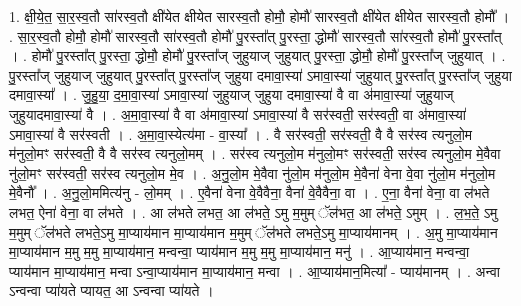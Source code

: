 \documentclass[17pt]{extarticle}
\begin{document}
1. क्षी॒ये॒त॒ सा॒र॒स्व॒तौ सा॑रस्व॒तौ क्षी॑येत क्षीयेत सारस्व॒तौ होमौ॒ होमौ॑ सारस्व॒तौ क्षी॑येत क्षीयेत सारस्व॒तौ होमौ᳚ । . सा॒र॒स्व॒तौ होमौ॒ होमौ॑ सारस्व॒तौ सा॑रस्व॒तौ होमौ॑ पु॒रस्ता᳚त् पु॒रस्ता॒ द्धोमौ॑ सारस्व॒तौ सा॑रस्व॒तौ होमौ॑ पु॒रस्ता᳚त् । . होमौ॑ पु॒रस्ता᳚त् पु॒रस्ता॒ द्धोमौ॒ होमौ॑ पु॒रस्ता᳚ज् जुहुयाज् जुहुयात् पु॒रस्ता॒ द्धोमौ॒ होमौ॑ पु॒रस्ता᳚ज् जुहुयात् । . पु॒रस्ता᳚ज् जुहुयाज् जुहुयात् पु॒रस्ता᳚त् पु॒रस्ता᳚ज् जुहुया दमावा॒स्या॑ ऽमावा॒स्या॑ जुहुयात् पु॒रस्ता᳚त् पु॒रस्ता᳚ज् जुहुया दमावा॒स्या᳚ । . जु॒हु॒या॒ द॒मा॒वा॒स्या॑ ऽमावा॒स्या॑ जुहुयाज् जुहुया दमावा॒स्या॑ वै वा अ॑मावा॒स्या॑ जुहुयाज् जुहुयादमावा॒स्या॑ वै । . अ॒मा॒वा॒स्या॑ वै वा अ॑मावा॒स्या॑ ऽमावा॒स्या॑ वै सर॑स्वती॒ सर॑स्वती॒ वा अ॑मावा॒स्या॑ ऽमावा॒स्या॑ वै सर॑स्वती । . अ॒मा॒वा॒स्येत्य॑मा - वा॒स्या᳚ । . वै सर॑स्वती॒ सर॑स्वती॒ वै वै सर॑स्व त्यनुलो॒म म॑नुलो॒मꣳ सर॑स्वती॒ वै वै सर॑स्व त्यनुलो॒मम् । . सर॑स्व त्यनुलो॒म म॑नुलो॒मꣳ सर॑स्वती॒ सर॑स्व त्यनुलो॒म मे॒वैवा नु॑लो॒मꣳ सर॑स्वती॒ सर॑स्व त्यनुलो॒म मे॒व । . अ॒नु॒लो॒म मे॒वैवा नु॑लो॒म म॑नुलो॒म मे॒वैना॑ वेना वे॒वा नु॑लो॒म म॑नुलो॒म मे॒वैनौ᳚ । . अ॒नु॒लो॒ममित्य॑नु - लो॒मम् । . ए॒वैना॑ वेना वे॒वैवैना॒ वैना॑ वे॒वैवैना॒ वा । . ए॒ना॒ वैना॑ वेना॒ वा ल॑भते लभत॒ ऐना॑ वेना॒ वा ल॑भते । . आ ल॑भते लभत॒ आ ल॑भते॒ ऽमु म॒मुम् ॅल॑भत॒ आ ल॑भते॒ ऽमुम् । . ल॒भ॒ते॒ ऽमु म॒मुम् ॅल॑भते लभते॒ऽमु मा॒प्याय॑मान मा॒प्याय॑मान म॒मुम् ॅल॑भते लभते॒ऽमु मा॒प्याय॑मानम् । . अ॒मु मा॒प्याय॑मान मा॒प्याय॑मान म॒मु म॒मु मा॒प्याय॑मान॒ मन्वन्वा॒ प्याय॑मान म॒मु म॒मु मा॒प्याय॑मान॒ मनु॑ । . आ॒प्याय॑मान॒ मन्वन्वा॒ प्याय॑मान मा॒प्याय॑मान॒ मन्वा ऽन्वा॒प्याय॑मान मा॒प्याय॑मान॒ मन्वा । . आ॒प्याय॑मान॒मित्या᳚ - प्याय॑मानम् । . अन्वा ऽन्वन्वा प्या॑यते प्यायत॒ आ ऽन्वन्वा प्या॑यते । \newline
\end{document}

